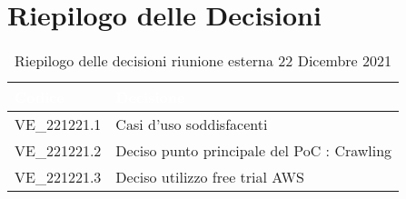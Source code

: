 \section{Riepilogo delle Decisioni}


\begin{table}[!htbp]
\renewcommand{\arraystretch}{1.5}
\begin{tabular}{m{}<{\centering}  m{}<{\centering}}
\rowcolor{darkblue} \textcolor{white}{\textbf{Codice}} & \textcolor{white}{\textbf{Decisione}} \\
\hline
VE\_221221.1 & Casi d'uso soddisfacenti \\
\rowcolor{gray!10} VE\_221221.2 & Deciso punto principale del PoC : Crawling \\
VE\_221221.3 & Deciso utilizzo free trial AWS\\
\end{tabular}
\caption{Riepilogo delle decisioni riunione esterna 22 Dicembre 2021}
\end{table}